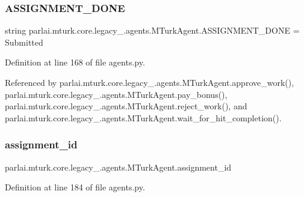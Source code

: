 \subsubsection{\texorpdfstring{A\+S\+S\+I\+G\+N\+M\+E\+N\+T\+\_\+\+D\+O\+NE}{ASSIGNMENT\_DONE}}
{\footnotesize\ttfamily string parlai.\+mturk.\+core.\+legacy\+\_.\+agents.\+M\+Turk\+Agent.\+A\+S\+S\+I\+G\+N\+M\+E\+N\+T\+\_\+\+D\+O\+NE = \textquotesingle{}Submitted\textquotesingle{}\hspace{0.3cm}{\ttfamily [static]}}



Definition at line 168 of file agents.\+py.



Referenced by parlai.\+mturk.\+core.\+legacy\+\_.\+agents.\+M\+Turk\+Agent.\+approve\+\_\+work(), parlai.\+mturk.\+core.\+legacy\+\_.\+agents.\+M\+Turk\+Agent.\+pay\+\_\+bonus(), parlai.\+mturk.\+core.\+legacy\+\_.\+agents.\+M\+Turk\+Agent.\+reject\+\_\+work(), and parlai.\+mturk.\+core.\+legacy\+\_.\+agents.\+M\+Turk\+Agent.\+wait\+\_\+for\+\_\+hit\+\_\+completion().

\mbox{\label{classparlai_1_1mturk_1_1core_1_1legacy__2018_1_1agents_1_1MTurkAgent_a702599b137e9311c097bae12ef194007}} 
\subsubsection{\texorpdfstring{assignment\+\_\+id}{assignment\_id}}
{\footnotesize\ttfamily parlai.\+mturk.\+core.\+legacy\+\_.\+agents.\+M\+Turk\+Agent.\+assignment\+\_\+id}



Definition at line 184 of file agents.\+py.



